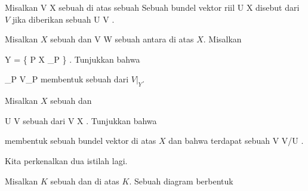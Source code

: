 Misalkan
\maabb {} { V } { X
} {}
sebuah
di atas sebuah
Sebuah bundel vektor riil
\maabb {} { U } { X
} {}
disebut
dari $V$ jika diberikan sebuah
\maabb {} { U } { V
} {}.

{}
{

Misalkan $X$ sebuah
dan
\maabb {\varphi} { V } { W
} {}
sebuah
antara
di atas $X$. Misalkan

\mavergleichskettedisp
{\vergleichskette
{ Y
}
{ =} { \left\{ P \in X  \mid  \varphi_P          \right\}
}
{ } {
}
{ } {
}
{ } {
}
}
{}{}{}.
Tunjukkan bahwa
 {} {}

\mavergleichskette
{\vergleichskette
{ \ker \varphi_P
}
{ \subseteq }{ V_P
}
{  }{
}
{    }{
}
{   }{
}
}
{}{}{}
membentuk sebuah
dari $V\vert_Y$.

}
{} {}

{}
{

Misalkan $X$ sebuah
dan

\mavergleichskette
{\vergleichskette
{ U
}
{ \subseteq }{ V
}
{  }{
}
{    }{
}
{   }{
}
}
{}{}{}
sebuah
dari
\maabb {} { V } { X
} {.}
Tunjukkan bahwa
 {} {}

 membentuk sebuah bundel vektor di atas $X$ dan bahwa terdapat sebuah
\maabb {} { V } { V/U
} {}.

}
{} {}

Kita perkenalkan dua istilah lagi.

Misalkan $K$ sebuah
dan
di atas $K$. Sebuah diagram berbentuk

 {  }

